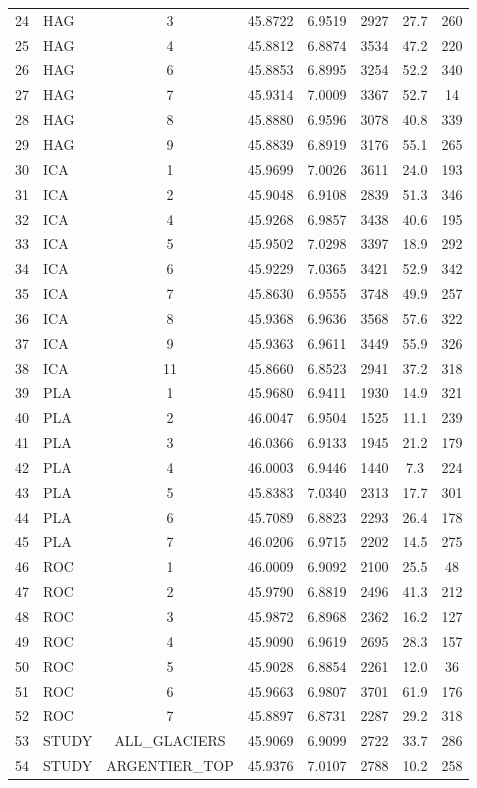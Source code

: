 \begin{table}[htbp]
\begin{tabular}{|l|l|c|c|c|c|c|c|}
24 & HAG & 3 & 45.8722 & 6.9519 & 2927 & 27.7 & 260 \\
25 & HAG & 4 & 45.8812 & 6.8874 & 3534 & 47.2 & 220 \\
26 & HAG & 6 & 45.8853 & 6.8995 & 3254 & 52.2 & 340 \\
27 & HAG & 7 & 45.9314 & 7.0009 & 3367 & 52.7 & 14 \\
28 & HAG & 8 & 45.8880 & 6.9596 & 3078 & 40.8 & 339 \\
29 & HAG & 9 & 45.8839 & 6.8919 & 3176 & 55.1 & 265 \\
30 & ICA & 1 & 45.9699 & 7.0026 & 3611 & 24.0 & 193 \\
31 & ICA & 2 & 45.9048 & 6.9108 & 2839 & 51.3 & 346 \\
32 & ICA & 4 & 45.9268 & 6.9857 & 3438 & 40.6 & 195 \\
33 & ICA & 5 & 45.9502 & 7.0298 & 3397 & 18.9 & 292 \\
34 & ICA & 6 & 45.9229 & 7.0365 & 3421 & 52.9 & 342 \\
35 & ICA & 7 & 45.8630 & 6.9555 & 3748 & 49.9 & 257 \\
36 & ICA & 8 & 45.9368 & 6.9636 & 3568 & 57.6 & 322 \\
37 & ICA & 9 & 45.9363 & 6.9611 & 3449 & 55.9 & 326 \\
38 & ICA & 11 & 45.8660 & 6.8523 & 2941 & 37.2 & 318 \\
39 & PLA & 1 & 45.9680 & 6.9411 & 1930 & 14.9 & 321 \\
40 & PLA & 2 & 46.0047 & 6.9504 & 1525 & 11.1 & 239 \\
41 & PLA & 3 & 46.0366 & 6.9133 & 1945 & 21.2 & 179 \\
42 & PLA & 4 & 46.0003 & 6.9446 & 1440 & 7.3 & 224 \\
43 & PLA & 5 & 45.8383 & 7.0340 & 2313 & 17.7 & 301 \\
44 & PLA & 6 & 45.7089 & 6.8823 & 2293 & 26.4 & 178 \\
45 & PLA & 7 & 46.0206 & 6.9715 & 2202 & 14.5 & 275 \\
46 & ROC & 1 & 46.0009 & 6.9092 & 2100 & 25.5 & 48 \\
47 & ROC & 2 & 45.9790 & 6.8819 & 2496 & 41.3 & 212 \\
48 & ROC & 3 & 45.9872 & 6.8968 & 2362 & 16.2 & 127 \\
49 & ROC & 4 & 45.9090 & 6.9619 & 2695 & 28.3 & 157 \\
50 & ROC & 5 & 45.9028 & 6.8854 & 2261 & 12.0 & 36 \\
51 & ROC & 6 & 45.9663 & 6.9807 & 3701 & 61.9 & 176 \\
52 & ROC & 7 & 45.8897 & 6.8731 & 2287 & 29.2 & 318 \\
53 & STUDY & ALL_GLACIERS & 45.9069 & 6.9099 & 2722 & 33.7 & 286 \\
54 & STUDY & ARGENTIER_TOP & 45.9376 & 7.0107 & 2788 & 10.2 & 258 \\

\hline
\end{tabular}
\end{table}
